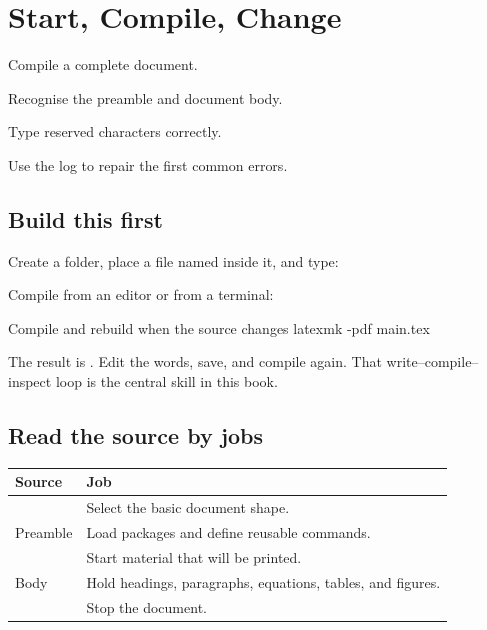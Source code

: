 \chapter{Start, Compile, Change}
\label{chap:start}

\begin{learningoutcomes}
  \item Compile a complete document.
  \item Recognise the preamble and document body.
  \item Type reserved characters correctly.
  \item Use the log to repair the first common errors.
\end{learningoutcomes}

\section{Build this first}

Create a folder, place a file named  inside it, and type:


Compile from an editor or from a terminal:

\begin{terminalcode}{Compile and rebuild when the source changes}
latexmk -pdf main.tex
\end{terminalcode}

The result is . Edit the words, save, and compile again. That
write--compile--inspect loop is the central skill in this book.

\section{Read the source by jobs}

\begin{center}
\begin{tabularx}{\linewidth}{@{}lX@{}}
\toprule
Source & Job \\
\midrule
{} & Select the basic document
shape. \\
Preamble & Load packages and define reusable commands. \\
 & Start material that will be printed. \\
Body & Hold headings, paragraphs, equations, tables, and figures. \\
 & Stop the document. \\
\bottomrule
\end{tabularx}
\end{center}

